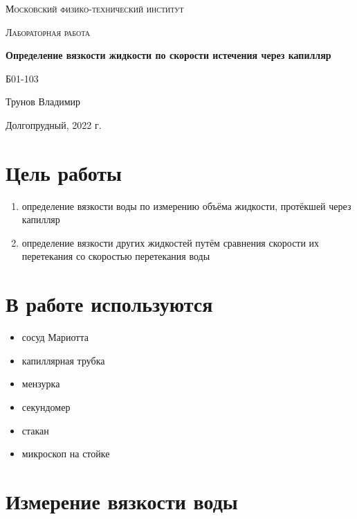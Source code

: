\documentclass[a4paper]{article}
\begin{document}
\begin{titlepage}
	\centering
	\vspace{5cm}
	{\scshape\LARGE Московский физико-технический институт \par}
	\vspace{4cm}
	{\scshape\Large Лабораторная работа \par}
	\vspace{1cm}
	{\huge\bfseries Определение вязкости жидкости по скорости истечения через капилляр \par}
	\vspace{1cm}
	\vfill
\begin{flushright}
	{\large Б01-103}\par
	\vspace{0.3cm}
	{\LARGE Трунов Владимир}
\end{flushright}
	

	\vfill

	Долгопрудный, 2022 г.
\end{titlepage}

\section{Цель работы}

\begin{enumerate}
    \item определение вязкости воды по измерению объёма жидкости, протёкшей через капилляр
    \item определение вязкости других жидкостей путём сравнения скорости их перетекания со скоростью перетекания воды
\end{enumerate}

\section{В работе используются}
\begin{itemize}
    \item сосуд Мариотта
    \item капиллярная трубка
    \item мензурка
    \item секундомер
    \item стакан
    \item микроскоп на стойке
\end{itemize}

\section{Измерение вязкости воды}
\end{document}
